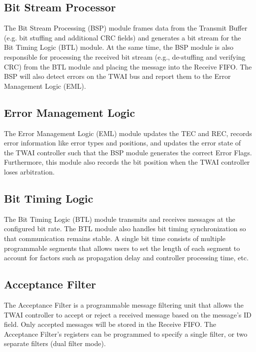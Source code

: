 \documentclass[main\_\_EN.tex]{subfiles}
\begin{document}
\subsection{Bit Stream Processor}
The Bit Stream Processing (BSP) module frames data from the Transmit Buffer (e.g. bit stuffing and additional CRC fields) and generates a bit stream for the Bit Timing Logic (BTL) module. At the same time, the BSP module is also responsible for processing the received bit stream (e.g., de-stuffing and verifying CRC) from the BTL module and placing the message into the Receive FIFO. The BSP will also detect errors on the TWAI bus and report them to the Error Management Logic (EML).

\subsection{Error Management Logic}
The Error Management Logic (EML) module updates the TEC and REC, records error information like error types and positions, and updates the error state of the TWAI controller such that the BSP module generates the correct Error Flags. Furthermore, this module also records the bit position when the TWAI controller loses arbitration.

\subsection{Bit Timing Logic}
The Bit Timing Logic (BTL) module transmits and receives messages at the configured bit rate. The BTL module also handles bit timing synchronization so that communication remains stable. A single bit time consists of multiple programmable segments that allows users to set the length of each segment to account for factors such as propagation delay and controller processing time, etc.

\subsection{Acceptance Filter}
The Acceptance Filter is a programmable message filtering unit that allows the TWAI controller to accept or reject a received message based on the message's ID field. Only accepted messages will be stored in the Receive FIFO. The Acceptance Filter's registers can be programmed to specify a single filter, or two separate filters (dual filter mode).
\end{document}
